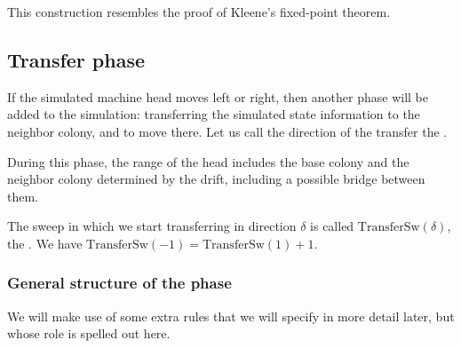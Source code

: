 \documentclass[12pt]{memoir}
\newcommand{\TransferSw}{\mathrm{TransferSw}}
\begin{document}
\begin{remark}
This construction resembles the proof of Kleene's fixed-point theorem.
\end{remark}



\subsection{Transfer phase}\label{sec:TransferPhase}

If the simulated machine head moves left or right, then another phase will
be added to the simulation: transferring the simulated state information to the
neighbor colony, and to move there.
Let us call the direction of the transfer the .

During this phase, the range of the head
includes the base colony and the neighbor colony
determined by the drift, including a possible bridge between them.

The sweep in which we start transferring in direction \( \delta \) is called
\( \TransferSw(\delta) \), the .
We have \( \TransferSw(-1) =\TransferSw(1)+1 \).

\subsubsection{General structure of the phase}\label{sec:TransferPhase.general-struc}

We will make use of some extra rules that we will
specify in more detail later, but whose role is spelled out here.
\end{document}
